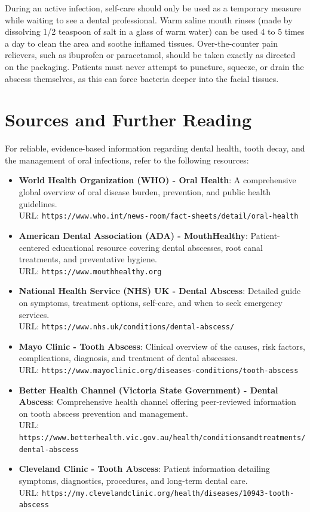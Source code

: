 During an active infection, self-care should only be used as a temporary measure while waiting to see a dental professional. Warm saline mouth rinses (made by dissolving 1/2 teaspoon of salt in a glass of warm water) can be used 4 to 5 times a day to clean the area and soothe inflamed tissues. Over-the-counter pain relievers, such as ibuprofen or paracetamol, should be taken exactly as directed on the packaging. Patients must never attempt to puncture, squeeze, or drain the abscess themselves, as this can force bacteria deeper into the facial tissues.

\section*{Sources and Further Reading}
For reliable, evidence-based information regarding dental health, tooth decay, and the management of oral infections, refer to the following resources:
\begin{itemize}
  \item \textbf{World Health Organization (WHO) - Oral Health}: A comprehensive global overview of oral disease burden, prevention, and public health guidelines. \\
  URL: \texttt{https://www.who.int/news-room/fact-sheets/detail/oral-health}
  \item \textbf{American Dental Association (ADA) - MouthHealthy}: Patient-centered educational resource covering dental abscesses, root canal treatments, and preventative hygiene. \\
  URL: \texttt{https://www.mouthhealthy.org}
  \item \textbf{National Health Service (NHS) UK - Dental Abscess}: Detailed guide on symptoms, treatment options, self-care, and when to seek emergency services. \\
  URL: \texttt{https://www.nhs.uk/conditions/dental-abscess/}
  \item \textbf{Mayo Clinic - Tooth Abscess}: Clinical overview of the causes, risk factors, complications, diagnosis, and treatment of dental abscesses. \\
  URL: \texttt{https://www.mayoclinic.org/diseases-conditions/tooth-abscess}
  \item \textbf{Better Health Channel (Victoria State Government) - Dental Abscess}: Comprehensive health channel offering peer-reviewed information on tooth abscess prevention and management. \\
  URL: \texttt{https://www.betterhealth.vic.gov.au/health/conditionsandtreatments/dental-abscess}
  \item \textbf{Cleveland Clinic - Tooth Abscess}: Patient information detailing symptoms, diagnostics, procedures, and long-term dental care. \\
  URL: \texttt{https://my.clevelandclinic.org/health/diseases/10943-tooth-abscess}
\end{itemize}